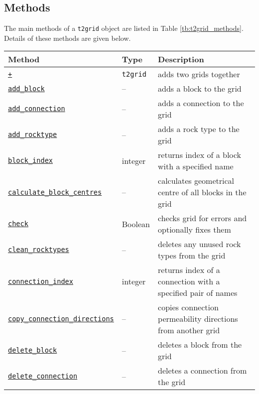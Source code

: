 \subsection{Methods}
\label{t2gridmethods}

The main methods of a \texttt{t2grid} object are listed in Table \ref{tb:t2grid_methods}.  Details of these methods are given below.

\begin{table}
  \begin{center}
    \begin{tabular}{|l|l|p{65mm}|}
      \hline
      \textbf{Method} & \textbf{Type} & \textbf{Description}\\
      \hline
      \hyperref[sec:t2grid:plus]{\texttt{+}} & \texttt{t2grid} & adds two grids together\\
      \hyperref[sec:t2grid:add_block]{\texttt{add\_block}} & -- & adds a block to the grid\\
      \hyperref[sec:t2grid:add_connection]{\texttt{add\_connection}} & -- & adds a connection to the grid\\
      \hyperref[sec:t2grid:add_rocktype]{\texttt{add\_rocktype}} & -- & adds a rock type to the grid\\
      \hyperref[sec:t2grid:block_index]{\texttt{block\_index}} & integer & returns index of a block with a specified name\\
      \hyperref[sec:t2grid:calculate_block_centres]{\texttt{calculate\_block\_centres}} & -- & calculates geometrical centre of all blocks in the grid\\
      \hyperref[sec:t2grid:check]{\texttt{check}} & Boolean & checks grid for errors and optionally fixes them\\
      \hyperref[sec:t2grid:clean_rocktypes]{\texttt{clean\_rocktypes}} & -- & deletes any unused rock types from the grid\\
      \hyperref[sec:t2grid:connection_index]{\texttt{connection\_index}} & integer & returns index of a connection with a specified pair of names\\
      \hyperref[sec:t2grid:copy_connection_directions]{\texttt{copy\_connection\_directions}} & -- & copies connection permeability directions from another grid\\
      \hyperref[sec:t2grid:delete_block]{\texttt{delete\_block}} & -- & deletes a block from the grid\\
      \hyperref[sec:t2grid:delete_connection]{\texttt{delete\_connection}} & -- & deletes a connection from the grid\\

\end{tabular}
\end{center}
\end{table}

